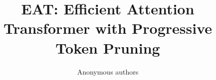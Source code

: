 \title{\textbf{EAT: Efficient Attention Transformer with Progressive Token Pruning}}

\author{Anonymous authors}
